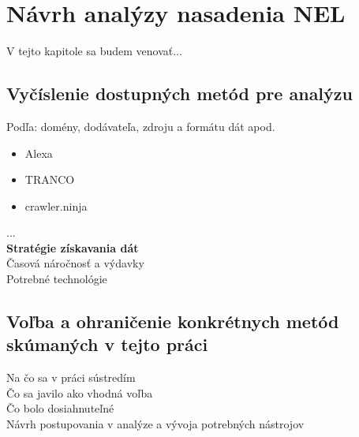 \chapter{Návrh analýzy nasadenia NEL}
\label{possible-analysis-strategies}

V tejto kapitole sa budem venovať...


\section{Vyčíslenie dostupných metód pre analýzu}

Podľa: domény, dodávateľa, zdroju a formátu dát apod.
\begin{itemize}
\item Alexa
\item TRANCO
\item crawler.ninja
\end{itemize}

...
\\
\textbf{Stratégie získavania dát}
\\
Časová náročnosť a výdavky
\\
Potrebné technológie

\section{Voľba a ohraničenie konkrétnych metód skúmaných v tejto práci}

Na čo sa v práci sústredím
\\
Čo sa javilo ako vhodná voľba
\\
Čo bolo dosiahnuteľné
\\
Návrh postupovania v analýze a vývoja potrebných nástrojov